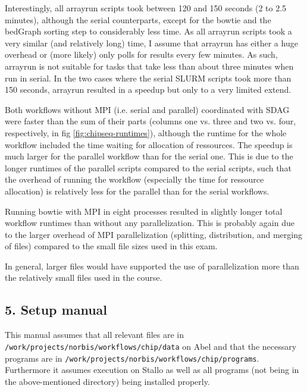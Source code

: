 \documentclass[paper=a4, 12pt]{scrartcl}
\begin{document}
Interestingly, all arrayrun scripts took between 120 and 150 seconds (2 to 2.5 minutes), although the serial counterparts, except for the bowtie and the bedGraph sorting step to considerably less time. As all arrayrun scripts took a very similar (and relatively long) time, I assume that arrayrun has either a huge overhead or (more likely) only polls for results every few minutes. As such, arrayrun is not suitable for tasks that take less than about three minutes when run in serial. In the two cases where the serial SLURM scripts took more than 150 seconds, arrayrun resulted in a speedup but only to a very limited extend.

Both workflows without MPI (i.e. serial and parallel) coordinated with SDAG were faster than the sum of their parts (columns one vs. three and two vs. four, respectively, in fig \ref{fig:chipseq-runtimes}), although the runtime for the whole workflow included the time waiting for allocation of ressources. The speedup is much larger for the parallel workflow than for the serial one. This is due to the longer runtimes of the parallel scripts compared to the serial scripts, such that the overhead of running the workflow (especially the time for ressource allocation) is relatively less for the parallel than for the serial workflows.

Running bowtie with MPI in eight processes resulted in slightly longer total workflow runtimes than without any parallelization. This is probably again due to the larger overhead of MPI parallelization (splitting, distribution, and merging of files) compared to the small file sizes used in this exam.

In general, larger files would have supported the use of parallelization more than the relatively small files used in the course.

\subsection{5. Setup manual}

This manual assumes that all relevant files are in \texttt{/work/}\allowbreak\texttt{projects/}\texttt{norbis/}\allowbreak\texttt{workflows/}\allowbreak\texttt{chip/}\allowbreak\texttt{data} on Abel and that the necessary programs are in \texttt{/work/}\allowbreak\texttt{projects/}\allowbreak\texttt{norbis/}\allowbreak\texttt{workflows/}\allowbreak\texttt{chip/}\allowbreak\texttt{programs}. Furthermore it assumes execution on Stallo as well as all programs (not being in the above-mentioned directory) being installed properly.
\end{document}
